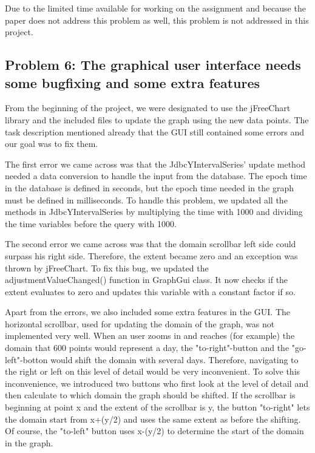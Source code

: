 Due to the limited time available for working on the assignment and because the paper\cite{wombacher2011} does not address this problem as well, this problem is not addressed in this project.

\subsection{Problem 6: The graphical user interface needs some bugfixing and some extra features}
From the beginning of the project, we were designated to use the jFreeChart library and the included files to update the graph using the new data points. The task description mentioned already that the GUI still contained some errors and our goal was to fix them.

The first error we came across was that the JdbcYIntervalSeries' update method needed a data conversion to handle the input from the database. The epoch time in the database is defined in seconds, but the epoch time needed in the graph must be defined in milliseconds. To handle this problem, we updated all the methods in JdbcYIntervalSeries by multiplying the time with 1000 and dividing the time variables before the query with 1000.

The second error we came across was that the domain scrollbar left side could surpass his right side. Therefore, the extent became zero and an exception was thrown by jFreeChart. To fix this bug, we updated the adjustmentValueChanged() function in GraphGui class. It now checks if the extent evaluates to zero and updates this variable with a constant factor if so.

Apart from the errors, we also included some extra features in the GUI. The horizontal scrollbar, used for updating the domain of the graph, was not implemented very well. When an user zooms in and reaches (for example) the domain that 600 points would represent a day, the "to-right"-button and the "go-left"-botton would shift the domain with several days. Therefore, navigating to the right or left on this level of detail would be very inconvenient.
To solve this inconvenience, we introduced two buttons who first look at the level of detail and then calculate to which domain the graph should be shifted. If the scrollbar is beginning at point x and the extent of the scrollbar is y, the button "to-right" lets the domain start from x+(y/2) and uses the same extent as before the shifting. Of course, the "to-left" button uses x-(y/2) to determine the start of the domain in the graph.
